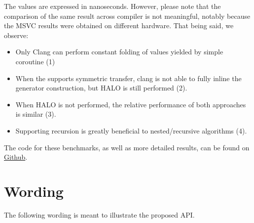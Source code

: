 \documentclass{wg21}
\begin{document}


The values are expressed in nanoseconds. However, please note that the comparison of the same result across compiler is not meaningful, notably because the MSVC results were obtained on different hardware.
That being said, we observe:

\begin{itemize}
    \item Only Clang can perform constant folding of values yielded by simple coroutine (1)
    \item When the  supports symmetric transfer, clang is not able to fully inline the generator construction, but HALO is still performed (2).
    \item When HALO is not performed, the relative performance of both approaches is similar (3).
    \item Supporting recursion is greatly beneficial to nested/recursive algorithms (4).
\end{itemize}

The code for these benchmarks, as well as more detailed results, can be found on \href{https://github.com/cor3ntin/coro_benchmark}{Github}.


\section{Wording}

The following wording is meant to illustrate the proposed API.
\end{document}
